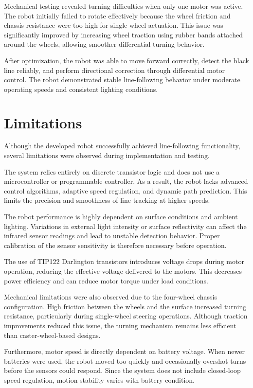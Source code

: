 \documentclass[conference]{IEEEtran}
\begin{document}
Mechanical testing revealed turning difficulties when only one motor was active. The robot initially failed to rotate effectively because the wheel friction and chassis resistance were too high for single-wheel actuation. This issue was significantly improved by increasing wheel traction using rubber bands attached around the wheels, allowing smoother differential turning behavior.

After optimization, the robot was able to move forward correctly, detect the black line reliably, and perform directional correction through differential motor control. The robot demonstrated stable line-following behavior under moderate operating speeds and consistent lighting conditions.

\section{Limitations}

Although the developed robot successfully achieved line-following functionality, several limitations were observed during implementation and testing.

The system relies entirely on discrete transistor logic and does not use a microcontroller or programmable controller. As a result, the robot lacks advanced control algorithms, adaptive speed regulation, and dynamic path prediction. This limits the precision and smoothness of line tracking at higher speeds.

The robot performance is highly dependent on surface conditions and ambient lighting. Variations in external light intensity or surface reflectivity can affect the infrared sensor readings and lead to unstable detection behavior. Proper calibration of the sensor sensitivity is therefore necessary before operation.

The use of TIP122 Darlington transistors introduces voltage drops during motor operation, reducing the effective voltage delivered to the motors. This decreases power efficiency and can reduce motor torque under load conditions.

Mechanical limitations were also observed due to the four-wheel chassis configuration. High friction between the wheels and the surface increased turning resistance, particularly during single-wheel steering operations. Although traction improvements reduced this issue, the turning mechanism remains less efficient than caster-wheel-based designs.

Furthermore, motor speed is directly dependent on battery voltage. When newer batteries were used, the robot moved too quickly and occasionally overshot turns before the sensors could respond. Since the system does not include closed-loop speed regulation, motion stability varies with battery condition.
\end{document}
